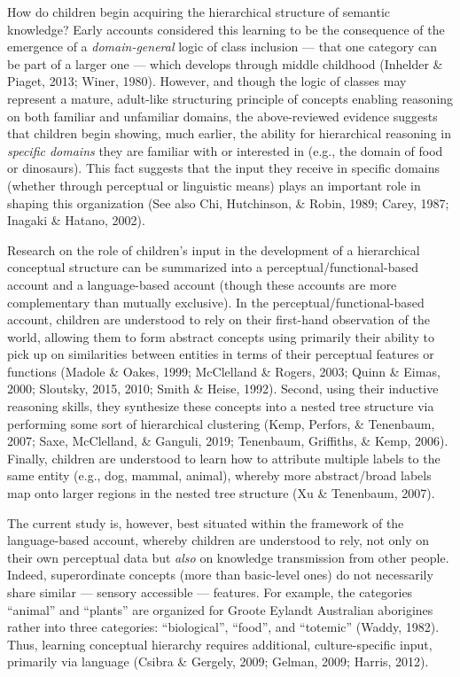 \documentclass[english,,man]{apa6}
\begin{document}
How do children begin acquiring the hierarchical structure of semantic knowledge? Early accounts considered this learning to be the consequence of the emergence of a \emph{domain-general} logic of class inclusion --- that one category can be part of a larger one --- which develops through middle childhood (Inhelder \& Piaget, 2013; Winer, 1980). However, and though the logic of classes may represent a mature, adult-like structuring principle of concepts enabling reasoning on both familiar and unfamiliar domains, the above-reviewed evidence suggests that children begin showing, much earlier, the ability for hierarchical reasoning in \emph{specific domains} they are familiar with or interested in (e.g., the domain of food or dinosaurs). This fact suggests that the input they receive in specific domains (whether through perceptual or linguistic means) plays an important role in shaping this organization (See also Chi, Hutchinson, \& Robin, 1989; Carey, 1987; Inagaki \& Hatano, 2002).

Research on the role of children's input in the development of a hierarchical conceptual structure can be summarized into a perceptual/functional-based account and a language-based account (though these accounts are more complementary than mutually exclusive). In the perceptual/functional-based account, children are understood to rely on their first-hand observation of the world, allowing them to form abstract concepts using primarily their ability to pick up on similarities between entities in terms of their perceptual features or functions (Madole \& Oakes, 1999; McClelland \& Rogers, 2003; Quinn \& Eimas, 2000; Sloutsky, 2015, 2010; Smith \& Heise, 1992). Second, using their inductive reasoning skills, they synthesize these concepts into a nested tree structure via performing some sort of hierarchical clustering (Kemp, Perfors, \& Tenenbaum, 2007; Saxe, McClelland, \& Ganguli, 2019; Tenenbaum, Griffiths, \& Kemp, 2006). Finally, children are understood to learn how to attribute multiple labels to the same entity (e.g., dog, mammal, animal), whereby more abstract/broad labels map onto larger regions in the nested tree structure (Xu \& Tenenbaum, 2007).

The current study is, however, best situated within the framework of the language-based account, whereby children are understood to rely, not only on their own perceptual data but \emph{also} on knowledge transmission from other people. Indeed, superordinate concepts (more than basic-level ones) do not necessarily share similar --- sensory accessible --- features. For example, the categories \enquote{animal} and \enquote{plants} are organized for Groote Eylandt Australian aborigines rather into three categories: \enquote{biological}, \enquote{food}, and \enquote{totemic} (Waddy, 1982). Thus, learning conceptual hierarchy requires additional, culture-specific input, primarily via language (Csibra \& Gergely, 2009; Gelman, 2009; Harris, 2012).
\end{document}
